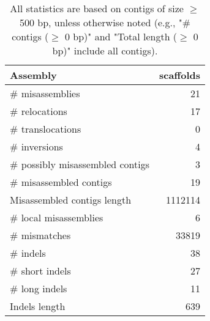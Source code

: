 \documentclass[12pt,a4paper]{article}
\begin{document}
\begin{table}[ht]
\begin{center}
\caption{All statistics are based on contigs of size $\geq$ 500 bp, unless otherwise noted (e.g., "\# contigs ($\geq$ 0 bp)" and "Total length ($\geq$ 0 bp)" include all contigs).}
\begin{tabular}{|l*{1}{|r}|}
\hline
Assembly & scaffolds \\ \hline
\# misassemblies & 21 \\ \hline
\hspace{5mm}\# relocations & 17 \\ \hline
\hspace{5mm}\# translocations & 0 \\ \hline
\hspace{5mm}\# inversions & 4 \\ \hline
\# possibly misassembled contigs & 3 \\ \hline
\# misassembled contigs & 19 \\ \hline
Misassembled contigs length & 1112114 \\ \hline
\# local misassemblies & 6 \\ \hline
\# mismatches & 33819 \\ \hline
\# indels & 38 \\ \hline
\hspace{5mm}\# short indels & 27 \\ \hline
\hspace{5mm}\# long indels & 11 \\ \hline
Indels length & 639 \\ \hline
\end{tabular}
\end{center}
\end{table}
\end{document}
